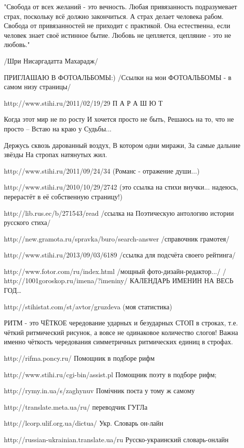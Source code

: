 "Свобода от всех желаний - это вечность.
Любая привязанность подразумевает страх, поскольку всё должно закончиться. А страх делает человека рабом.
Свобода от привязанностей не приходит с практикой.
Она естественна, если человек знает своё истинное бытие.
Любовь не цепляется, цепляние - это не любовь."

/Шри Нисаргадатта Махарадж/

ПРИГЛАШАЮ В ФОТОАЛЬБОМЫ:)
/Ссылки на мои ФОТОАЛЬБОМЫ - в самом низу страницы/

http://www.stihi.ru/2011/02/19/29
П А Р А Ш Ю Т

Когда этот мир не по росту
И хочется просто не быть,
Решаюсь на то, что не просто –
Встаю на краю у Судьбы...

Держусь сквозь дарованный воздух,
В котором одни миражи,
За самые дальние звёзды
На стропах натянутых жил.

http://www.stihi.ru/2011/09/24/34
(Романс - отражение души...)

http://www.stihi.ru/2010/10/29/2742
(это ссылка на стихи внучки... надеюсь, перерастёт в её собственную страницу!)

http://lib.rus.ec/b/271543/read
/ссылка на Поэтическую антологию истории русского стиха/

http://new.gramota.ru/spravka/buro/search-answer
/справочник грамотея/

http://www.stihi.ru/2013/09/03/6189
/ссылка для подсчёта своего рейтинга/

http://www.fotor.com/ru/index.html
/мощный фото-дизайн-редактор.../
/
http://1001goroskop.ru/imena/?imeniny/
КАЛЕНДАРЬ ИМЕНИН НА ВЕСЬ ГОД…

http://stihistat.com/st/avtor/gruzdeva
(моя статистика)

РИТМ - это ЧЁТКОЕ чередование ударных и безударных СТОП в строках, т.е. чёткий ритмический рисунок, а вовсе не одинаковое количество слогов! Важна именно чёткость чередования симметричных ритмических единиц в строфах.

http://rifma.poncy.ru/
Помощник в подборе рифм

http://www.stihi.ru/cgi-bin/assist.pl
Помощник поэту в подборе рифм;

http://rymy.in.ua/s/zaghynuv
Помічник поєта у тому ж самому

http://translate.meta.ua/ru/
переводчик ГУГЛа

http://lcorp.ulif.org.ua/dictua/
Укр. Словарь он-лайн

http://russian-ukrainian.translate.ua/ru
Русско-украинский словарь-онлайн

